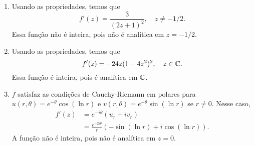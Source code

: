 \begin{questions}
\begin{solution}
\begin{multicols}{2}
\begin{enumerate}[label=(\alph*)]
      \item Usando as propriedades, temos que
      \[f'(z) = \frac{3}{(2z +1)^2},\quad z\neq -1/2.\]
      Essa função não é inteira, pois não é analítica em $z=-1/2$.
      
      \item Usando as propriedades, temos que
      \[f'(z) = -24z(1-4z^2)^2,\quad z\in{\mathbb C}.\]
      Essa função é inteira, pois é analítica em ${\mathbb C}$.
      
      \item $f$ satisfaz as condições de Cauchy-Riemann em polares para $u(r,\theta) = e^{-\theta}\cos(\ln r)$ e $v(r,\theta) = e^{-\theta}\sin(\ln r)$ se $r\neq 0$. Nesse caso,
      \begin{align*}
          f'(z) &= e^{-i\theta} (u_r +i v_r) \\
            &= \frac{e^{-2i\theta}}{r}(-\sin(\ln r) + i \cos(\ln r)).
      \end{align*}
      A função não é inteira, pois não é analítica em $z=0$.
      
    \end{enumerate}
    \end{multicols}
\end{solution}


\end{questions}

